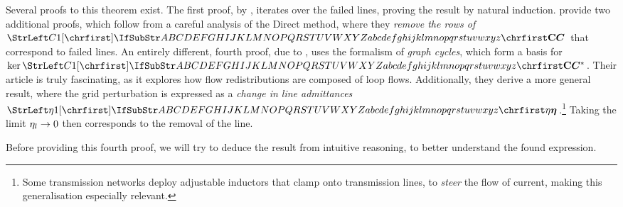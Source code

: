 \documentclass[main.tex]{subfiles}
\begin{document}
Several proofs to this theorem exist. The first proof, by \cite{Guler2007}, iterates over the failed lines, proving the result by natural induction. \citep{Guo2009} provide two additional proofs, which follow from a careful analysis of the Direct method, where they \emph{remove the rows of $\mat{C}$} that correspond to failed lines. An entirely different, fourth proof, due to \cite{Ronellenftisch2017}, uses the formalism of \emph{graph cycles}, which form a basis for $\ker \mat{C}^*$. Their article is truly fascinating, as it explores how flow redistributions are composed of loop flows. Additionally, they derive a more general result, where the grid perturbation is expressed as a \emph{change in line admittances $\mat{\eta}$}.\footnote{Some transmission networks deploy adjustable inductors that clamp onto transmission lines, to \emph{steer} the flow of current, making this generalisation especially relevant.} Taking the limit ${\mathrm{\eta}}_l \rightarrow 0$ then corresponds to the removal of the line.

Before providing this fourth proof, we will try to deduce the result from intuitive reasoning, to better understand the found expression.
\end{document}
